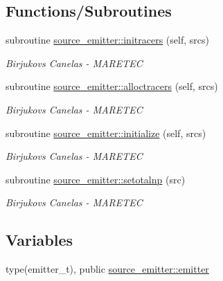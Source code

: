 \subsection*{Functions/\+Subroutines}
\begin{DoxyCompactItemize}
\item 
subroutine \hyperlink{namespacesource__emitter_a2fb64d19c0016b31bd9dab0a13785d61}{source\+\_\+emitter\+::initracers} (self, srcs)
\begin{DoxyCompactList}\small\item\em Birjukovs Canelas -\/ M\+A\+R\+E\+T\+EC \end{DoxyCompactList}\item 
subroutine \hyperlink{namespacesource__emitter_a54e88b7aa868ff9de8cf018208a20585}{source\+\_\+emitter\+::alloctracers} (self, srcs)
\begin{DoxyCompactList}\small\item\em Birjukovs Canelas -\/ M\+A\+R\+E\+T\+EC \end{DoxyCompactList}\item 
subroutine \hyperlink{namespacesource__emitter_a6400b97541c15fcf0ec523b359aacac9}{source\+\_\+emitter\+::initialize} (self, srcs)
\begin{DoxyCompactList}\small\item\em Birjukovs Canelas -\/ M\+A\+R\+E\+T\+EC \end{DoxyCompactList}\item 
subroutine \hyperlink{namespacesource__emitter_a73d054a39fc1fccfde74173a5c7f2c58}{source\+\_\+emitter\+::setotalnp} (src)
\begin{DoxyCompactList}\small\item\em Birjukovs Canelas -\/ M\+A\+R\+E\+T\+EC \end{DoxyCompactList}\end{DoxyCompactItemize}
\subsection*{Variables}
\begin{DoxyCompactItemize}
\item 
type(emitter\+\_\+t), public \hyperlink{namespacesource__emitter_a357876a84a74e23c44e92ab8ef7dc35e}{source\+\_\+emitter\+::emitter}
\end{DoxyCompactItemize}
